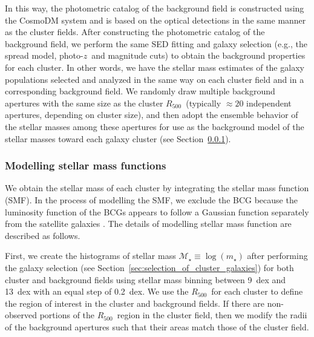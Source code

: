 \documentclass[useAMS,usenatbib,iop,numberedappendix]{mn2e}
\newcommand{\Rfiveoo}{\ensuremath{R_{500}}}
\newcommand{\redshift}{\ensuremath{z}}
\newcommand{\mstar}{\ensuremath{m_{\star}}}
\begin{document}
In this way, the photometric catalog of the background field is constructed using the CosmoDM system and is based on the optical detections in the same manner as the cluster fields.
After constructing the photometric catalog of the background field, we perform the same SED fitting and galaxy selection (e.g., the spread model, photo-\redshift\ and magnitude cuts) to obtain the background properties for each cluster.  In other words, we have the stellar mass estimates of the galaxy populations selected and analyzed in the same way on each cluster field and in a corresponding background field.
We randomly draw multiple background apertures with the same size as the cluster \Rfiveoo\ (typically $\approx20$ independent apertures, depending on cluster size), and then adopt the ensemble behavior of the stellar masses among these apertures for use as the background model of the stellar masses toward each galaxy cluster (see Section~\ref{sec:smf}).


\subsubsection{Modelling stellar mass functions}
\label{sec:smf}

We obtain the stellar mass of each cluster by integrating the stellar mass function (SMF).  In the process of modelling the SMF, we exclude the BCG because the luminosity function of the BCGs appears to follow a Gaussian function separately from the satellite galaxies \citep[e.g.,][]{hansen05,hansen09}.  The details of modelling stellar mass function are described as follows.

First, we create the histograms of stellar mass $\mathcal{M}_{\star} \equiv \log(\mstar)$ 
after performing the galaxy selection (see Section~\ref{sec:selection_of_cluster_galaxies}) for both cluster and background fields using stellar mass binning between 9~dex and 13~dex with an equal step of 0.2~dex.  We use the \Rfiveoo\ for each cluster to define the region of interest in the cluster and background fields.  If there are non-observed portions of the \Rfiveoo\ region in the cluster field, then we modify the radii of the background apertures such that their areas match those of the cluster field.  
\end{document}
